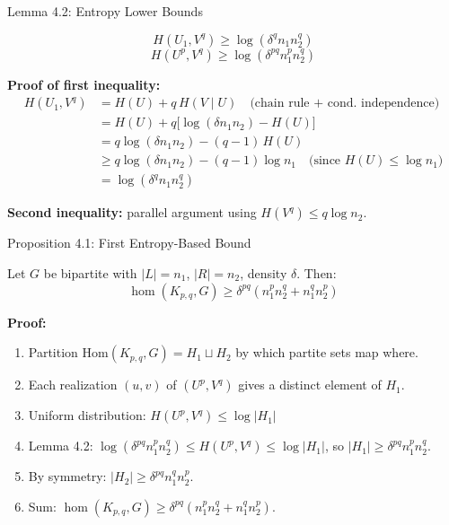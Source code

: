 \documentclass[aspectratio=169]{beamer}
\begin{document}
\begin{frame}{Lemma 4.2: Entropy Lower Bounds}
  \begin{theorem}[Lemma 4.2]
    \[
      H(U_1, V^q) \geq \log(\delta^q n_1 n_2^q)
    \]
    \[
      H(U^p, V^q) \geq \log(\delta^{pq} n_1^p n_2^q)
    \]
  \end{theorem}

  \textbf{Proof of first inequality:}
  \begin{align*}
    H(U_1, V^q) &= H(U) + q\,H(V \mid U) \quad \text{(chain rule + cond.\ independence)}\\
                &= H(U) + q\bigl[\log(\delta n_1 n_2) - H(U)\bigr]\\
                &= q\log(\delta n_1 n_2) - (q-1)\,H(U)\\
                &\geq q\log(\delta n_1 n_2) - (q-1)\log n_1 \quad \text{(since $H(U) \leq \log n_1$)}\\
                &= \log(\delta^q n_1 n_2^q)
  \end{align*}

  \textbf{Second inequality:} parallel argument using $H(V^q) \leq q \log n_2$.
\end{frame}

\begin{frame}{Proposition 4.1: First Entropy-Based Bound}
  \begin{theorem}[Proposition 4.1]
    Let $G$ be bipartite with $|L| = n_1$, $|R| = n_2$, density $\delta$. Then:
    \[
      \hom(K_{p,q}, G) \geq \delta^{pq}(n_1^p n_2^q + n_1^q n_2^p)
    \]
  \end{theorem}

  \textbf{Proof:}
  \begin{enumerate}
    \item Partition $\mathrm{Hom}(K_{p,q}, G) = H_1 \sqcup H_2$ by which partite sets map where.
    \item Each realization $(u,v)$ of $(U^p, V^q)$ gives a distinct element of $H_1$.
    \item Uniform distribution: $H(U^p, V^q) \leq \log |H_1|$
    \item Lemma 4.2: $\log(\delta^{pq} n_1^p n_2^q) \leq H(U^p, V^q) \leq \log |H_1|$, so $|H_1| \geq \delta^{pq} n_1^p n_2^q$.
    \item By symmetry: $|H_2| \geq \delta^{pq} n_1^q n_2^p$.
    \item Sum: $\hom(K_{p,q}, G) \geq \delta^{pq}(n_1^p n_2^q + n_1^q n_2^p)$.
  \end{enumerate}
\end{frame}
\end{document}
